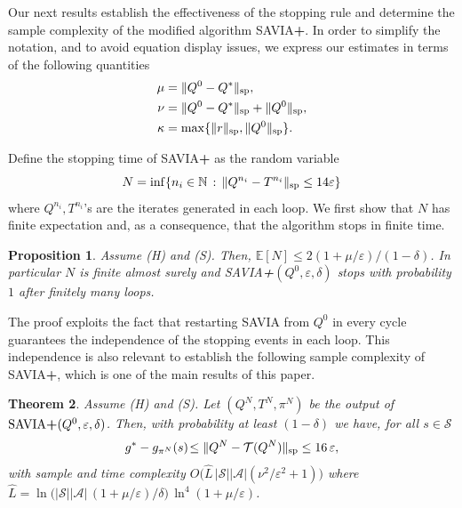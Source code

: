 \documentclass{article}
\newcommand{\cA}{\mathcal{A}}
\newcommand{\cS}{\mathcal{S}}
\newcommand{\expec}{\mathbb{E}}
\newcommand{\T}{\mathcal{T}}
\renewcommand{\sp}[1]{\|{#1}\|_\text{\rm sp}}
\newcommand{\R}{r}
\newcommand{\st}{N}
\theoremstyle{plain}
\newtheorem{theorem}{Theorem}[section]
\newtheorem{proposition}[theorem]{Proposition}
\theoremstyle{definition}
\theoremstyle{remark}
\begin{document}
Our next results establish the effectiveness of the stopping rule and determine the sample complexity of  the modified algorithm \mbox{\rm SAVIA\textbf{+}}. In order to simplify the notation, and to avoid equation display issues, we express our estimates in terms of the following quantities
\vspace{-1ex}
\begin{align*}
    \mu&=\sp{Q^0-Q^*},\\
    \nu&=\sp{Q^0-Q^*}+\sp{Q^0},\\
    \kappa&=\max\{\sp{\R},\sp{Q^0}\}.
\end{align*}

\vspace{-2ex}
Define the stopping time of \mbox{\rm SAVIA\textbf{+}} as the random variable
$$
 \st =\inf\{{ n_i \in \mathbb N \,:\, \sp{Q^{n_i}-T^{n_i}} \le 14\varepsilon}\}
$$
where $Q^{n_i},T^{n_i}$'s are the iterates generated 
in each loop. We first show that $N$ has finite expectation and, as a consequence, that the algorithm stops in finite time. 
\begin{proposition} \label{Prop:3.3}
Assume \mbox{\sc (H)} and \mbox{\sc (S)}. Then, $\expec [N] \le {2(1+\mu/\varepsilon)}/{(1-\delta)}$. In particular $N$ is finite almost surely and \mbox{\rm SAVIA\textbf{+}}$(Q^0,\varepsilon,\delta)$ stops with probability $1$ after finitely many loops.  
\end{proposition}
The proof exploits the fact that restarting \mbox{\rm SAVIA} from $Q^0$ in every cycle guarantees the independence of the stopping events in each loop. 
This independence is also relevant to establish the following sample complexity of \mbox{\rm SAVIA\textbf{+}}, which is one of the main results of this paper.



\begin{theorem}\label{thm:err-D}
Assume \mbox{\sc (H)} and \mbox{\sc (S)}. Let $(Q^{N},T^{N},\pi^{N})$ be the output of $\mbox{\sc \mbox{\rm SAVIA\textbf{+}}}(Q^0,\varepsilon,\delta)$. Then, with probability at least $(1-\delta)$ we have, for all $s\in\cS$ 
\vspace{-1ex}
\begin{equation*} g^*-g_{\pi^N}(s)\! \leq \sp{Q^N-\T(Q^N)}\leq 16\,\varepsilon,
\end{equation*}
 with sample and time complexity ${O}\big(\widehat{L}\,|\cS||\cA|(
\nu^2/\varepsilon^{2}\!+\!1)\big)$ where $\widehat{L}=\ln\!\big(|\cS||\cA|\,(1\!+\!\mu/\varepsilon)/\delta\big)\,\ln^4(1\!+\!\mu/\varepsilon)$. 
\end{theorem}
\end{document}
